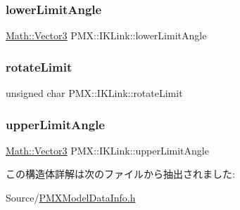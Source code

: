 \subsubsection{\texorpdfstring{lower\+Limit\+Angle}{lowerLimitAngle}}
{\footnotesize\ttfamily \mbox{\hyperlink{struct_math_1_1_vector3}{Math\+::\+Vector3}} P\+M\+X\+::\+I\+K\+Link\+::lower\+Limit\+Angle}

\mbox{\label{struct_p_m_x_1_1_i_k_link_ad4aca711c0ef48bb144f55e021e2755d}} 
\subsubsection{\texorpdfstring{rotate\+Limit}{rotateLimit}}
{\footnotesize\ttfamily unsigned char P\+M\+X\+::\+I\+K\+Link\+::rotate\+Limit}

\mbox{\label{struct_p_m_x_1_1_i_k_link_a250fdb6f51a1c23882b3e7b1bbbee847}} 
\subsubsection{\texorpdfstring{upper\+Limit\+Angle}{upperLimitAngle}}
{\footnotesize\ttfamily \mbox{\hyperlink{struct_math_1_1_vector3}{Math\+::\+Vector3}} P\+M\+X\+::\+I\+K\+Link\+::upper\+Limit\+Angle}



この構造体詳解は次のファイルから抽出されました\+:\begin{DoxyCompactItemize}
\item 
Source/\mbox{\hyperlink{_p_m_x_model_data_info_8h}{P\+M\+X\+Model\+Data\+Info.\+h}}\end{DoxyCompactItemize}
